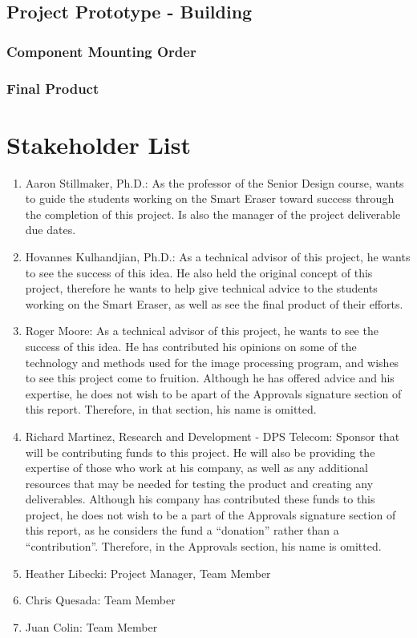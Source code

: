\subsection{Project Prototype - Building}
\subsubsection{Component Mounting Order}
\subsubsection{Final Product}

 \section{Stakeholder List}
 \begin{enumerate}
 	\item	Aaron Stillmaker, Ph.D.: As the professor of the Senior Design course, wants to guide the students working on the Smart Eraser toward success through the completion of this project. Is also the manager of the project deliverable due dates.\\ 
 	\item   Hovannes Kulhandjian, Ph.D.: As a technical advisor of this project, he wants to see the success of this idea. He also held the original concept of this project, therefore he wants to help give technical advice to the students working on the Smart Eraser, as well as see the final product of their efforts.\\
 	\item   Roger Moore: As a technical advisor of this project, he wants to see the success of this idea. He has contributed his opinions on some of the technology and methods used for the image processing program, and wishes to see this project come to fruition. Although he has offered advice and his expertise, he does not wish to be apart of the Approvals signature section of this report. Therefore, in that section, his name is omitted.\\
 	\item   Richard Martinez, Research and Development - DPS Telecom: Sponsor that will be contributing funds to this project. He will also be providing the expertise of those who work at his company, as well as any additional resources that may be needed for testing the product and creating any deliverables. Although his company has contributed these funds to this project, he does not wish to be a part of the Approvals signature section of this report, as he considers the fund a “donation” rather than a “contribution”. Therefore, in the Approvals section, his name is omitted.\\
 	\item	Heather Libecki: Project Manager, Team Member\\
 	\item	Chris Quesada: Team Member\\
	\item 	Juan Colin: Team Member\\
 	 	
 \end{enumerate}
 
